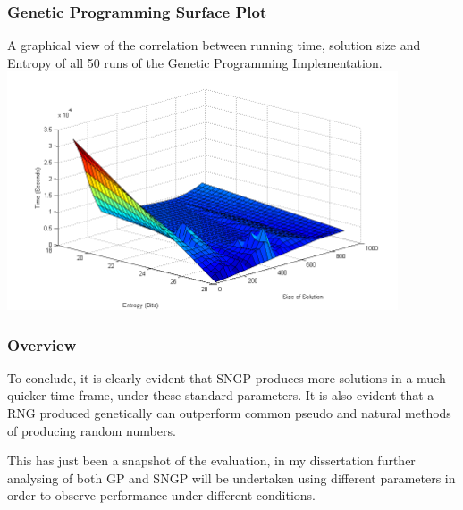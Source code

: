 \documentclass{beamer}
\begin{document}
\begin{frame}
\frametitle{Genetic Programming Surface Plot}
A graphical view of the correlation between running time, solution size and Entropy of all 50 runs of the Genetic Programming Implementation.
\includegraphics[keepaspectratio=true, height= 200pt]{gp.png}
\end{frame}

\begin{frame}
\frametitle{Overview}
To conclude, it is clearly evident that SNGP produces more solutions in a much quicker time frame, under these standard parameters. It is also evident that a RNG produced genetically can outperform common pseudo and natural methods of producing random numbers.\newline

This has just been a snapshot of the evaluation, in my dissertation further analysing of both GP and SNGP will be undertaken using different parameters in order to observe performance under different conditions.

\end{frame}
\end{document}
